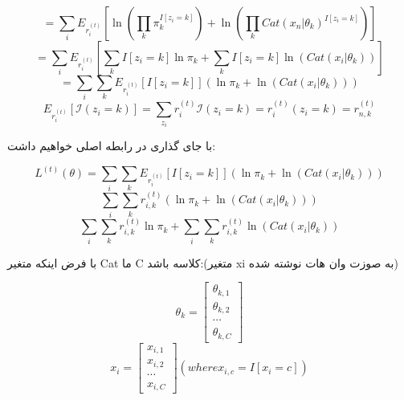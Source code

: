 \begin{equation}
= \sum_{i} E_{r_i^{(t)}} \left[ \ln \left( \prod_{k} \pi_{k}^{I[z_i=k]} \right) + \ln \left( \prod_{k} Cat(x_n|\theta_{k})^{I[z_i=k]} \right) \right]
\end{equation}
\begin{equation}
= \sum_{i} E_{r_i^{(t)}} \left[ \sum_{k} I[z_i = k] \ln \pi_k + \sum_{k} I[z_i = k] \ln \left( Cat(x_i|\theta_k) \right) \right]
\end{equation}
\begin{equation}
= \sum_{i} \sum_{k} E_{r^{(t)}_i} \left[ I[z_i = k] \right] \left( \ln \pi_k + \ln \left( Cat(x_i|\theta_k) \right) \right)
\end{equation}
\begin{equation}
{E}_{r_i^{(t)}} [\mathcal I (z_i = k)] = \sum_{z_i} r^{(t)}_i \mathcal I(z_i = k) = r^{(t)}_i(z_i = k) = r^{(t)}_{n,k}
\end{equation}
\begin{flushright}
با جای گذاری در رابطه اصلی خواهیم داشت:
\end{flushright}
\begin{equation}
L^{(t)}(\theta)= \sum_{i} \sum_{k} E_{r^{(t)}_i} \left[ I[z_i = k] \right] \left( \ln \pi_k + \ln \left( Cat(x_i|\theta_k) \right) \right)
\end{equation}
\begin{equation}
 \sum_{i} \sum_{k} {r^{(t)}_{i,k}}  \left( \ln \pi_k + \ln \left( Cat(x_i|\theta_k) \right) \right)
\end{equation}
\begin{equation}
 \sum_{i} \sum_{k} {r^{(t)}_{i,k}} \ln \pi_k + \sum_{i} \sum_{k} {r^{(t)}_{i,k}} \ln ( Cat(x_i|\theta_k)) 
\end{equation}
\begin{flushright}
با فرض اینکه متغیر Cat ما C کلاسه باشد:(متغیر xi به صوزت وان هات نوشته شده)
\end{flushright}
\begin{equation}
\theta_k =
\begin{bmatrix}
\theta_{k,1} \\ \theta_{k,2} \\ \cdots \\ \theta_{k,C}
\end{bmatrix}
\end{equation}
\begin{equation}
x_i =
\begin{bmatrix}
x_{i,1} \\ x_{i,2} \\ \cdots \\ x_{i,C} 
\end{bmatrix}
(where      x_{i,c} = I[x_i = c])
\end{equation}
